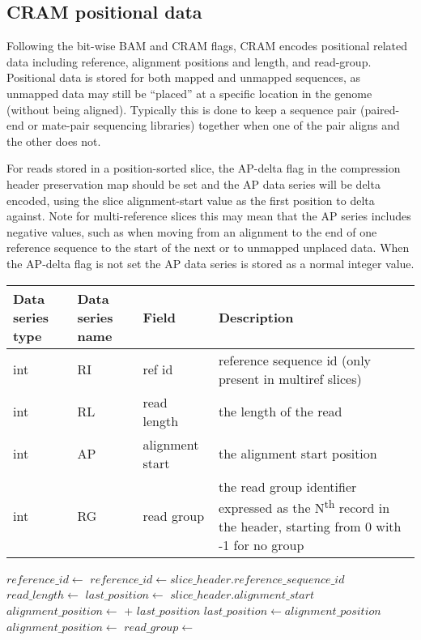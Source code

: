 \documentclass[a4paper]{article}
\begin{document}
\subsection{\textbf{CRAM positional data}}
\label{subsec:positions}

Following the bit-wise BAM and CRAM flags, CRAM encodes positional related data including reference, alignment positions and length, and read-group.
Positional data is stored for both mapped and unmapped sequences, as unmapped data may still be ``placed'' at a specific location in the genome (without being aligned).
Typically this is done to keep a sequence pair (paired-end or mate-pair sequencing libraries) together when one of the pair aligns and the other does not.

For reads stored in a position-sorted slice, the AP-delta flag in the compression header preservation map should be set and the AP data series will be delta encoded, using the slice alignment-start value as the first position to delta against.
Note for multi-reference slices this may mean that the AP series includes negative values, such as when moving from an alignment to the end of one reference sequence to the start of the next or to unmapped unplaced data.  When the AP-delta flag is not set the AP data series is stored as a normal integer value.

\begin{tabular}{|>{\raggedright}p{70pt}|>{\raggedright}p{75pt}|>{\raggedright}p{90pt}|>{\raggedright}p{171pt}|}
\hline
\textbf{Data series type} & \textbf{Data series name} & \textbf{Field} & \textbf{Description}\tabularnewline
\hline
int & RI & ref id & reference sequence id (only present in multiref slices)\tabularnewline
\hline
int & RL & read length & the length of the read\tabularnewline
\hline
int & AP & alignment start & the alignment start position\tabularnewline
\hline
int & RG & read group & the read group identifier expressed as the N\textsuperscript{th} record in the header, starting from 0 with -1 for no group\tabularnewline
\hline
\end{tabular}

\vskip 20pt
\begin{algorithmic}[1]
  \State $reference\_id\gets$ 
\Else
  \State $reference\_id\gets slice\_header.reference\_sequence\_id$
\EndIf
\State $read\_length \gets$ 
        \State $last\_position\gets$ $slice\_header.alignment\_start$
    \EndIf
    \State $alignment\_position \gets$  + $last\_position$
    \State $last\_position \gets alignment\_position$
\Else
    \State $alignment\_position \gets$ 
\EndIf
\State $read\_group \gets$ 
\EndProcedure
\end{algorithmic}
\end{document}

